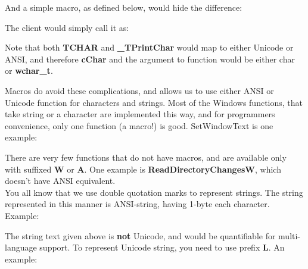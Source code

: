 	And a simple macro, as defined below, would hide the difference:\\
	
	
	The client would simply call it as:\\
	
	
	Note that both \textbf{TCHAR} and \textbf{\_TPrintChar} would map to either Unicode or ANSI, and therefore \textbf{cChar} and the argument to function would be either char or \textbf{wchar\_t}.
	
	Macros do avoid these complications, and allows us to use either ANSI or Unicode function for characters and strings. Most of the Windows functions, that take string or a character are implemented this way, and for programmers convenience, only one function (a macro!) is good. SetWindowText is one example:
	
	
	There are very few functions that do not have macros, and are available only with suffixed \textbf{W} or \textbf{A}. One example is \textbf{ReadDirectoryChangesW}, which doesn't have ANSI equivalent.\\
	
	You all know that we use double quotation marks to represent strings. The string represented in this manner is ANSI-string, having 1-byte each character. Example:\\
	
	
	
	The string text given above is \textbf{not} Unicode, and would be quantifiable for multi-language support. To represent Unicode string, you need to use prefix \textbf{L}. An example:\\
	
